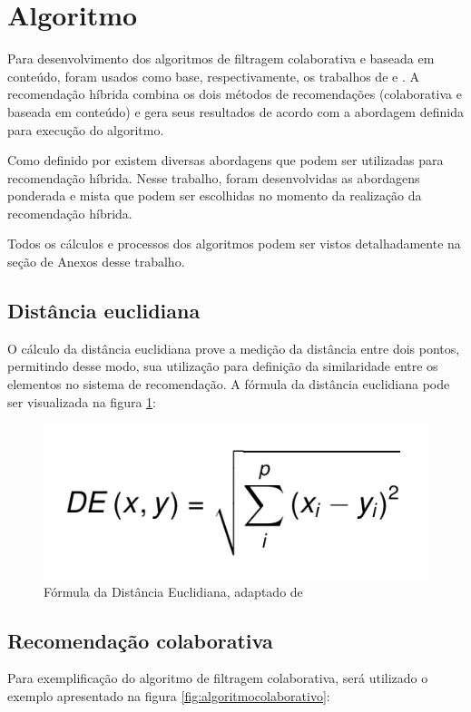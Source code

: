 \section{Algoritmo}

Para desenvolvimento dos algoritmos de filtragem colaborativa e baseada em conteúdo, foram usados como base, respectivamente, os trabalhos de  e . A recomendação híbrida combina os dois métodos de recomendações (colaborativa e baseada em conteúdo) e gera seus resultados de acordo com a abordagem definida para execução do algoritmo.

Como definido por \cite{barbosa2014} existem diversas abordagens que podem ser utilizadas para recomendação híbrida. Nesse trabalho, foram desenvolvidas as abordagens ponderada e mista que podem ser escolhidas no momento da realização da recomendação híbrida.

Todos os cálculos e processos dos algoritmos podem ser vistos detalhadamente na seção de Anexos desse trabalho.

\subsection{Distância euclidiana}

O cálculo da distância euclidiana prove a medição da distância entre dois pontos, permitindo desse modo, sua utilização para definição da similaridade entre os elementos no sistema de recomendação. A fórmula da distância euclidiana pode ser visualizada na figura \ref{fig:distanciaEuclidianaFormula}:

\begin{figure}[H]
	\centering
	\includegraphics[width=0.4\linewidth]{imagens/equacaoEuclidiana.png}
	\caption[Fórmula da Distância Euclidiana]{Fórmula da Distância Euclidiana, adaptado de \cite{danielsson1980euclidean}}
    \label{fig:distanciaEuclidianaFormula}
\end{figure}

\subsection{Recomendação colaborativa}

Para exemplificação do algoritmo de filtragem colaborativa, será utilizado o exemplo apresentado na figura \ref{fig:algoritmocolaborativo}:

